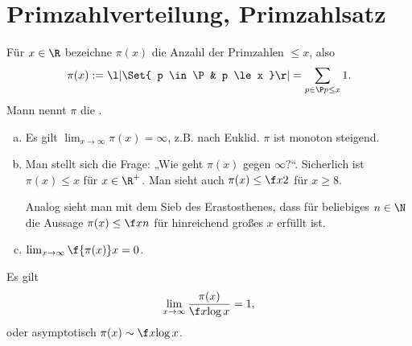 \chapter{Primzahlverteilung, Primzahlsatz} \label{chap:7}


\begin{df} \label{7.1}
	Für $x \in \R$ bezeichne $\pi(x)$ die Anzahl der Primzahlen $\le x$, also
	\[
		\pi(x)
		:= \l| \Set{ p \in \P & p \le x } \r|
		= \sum_{\substack{p \in \P}{p \le x}} 1.
	\]
	Mann nennt $\pi$ die .
\end{df}

\begin{nt*}
	\begin{enumerate}[a)]
		\item
			Es gilt $\lim_{x \to \infty} \pi(x) = \infty$, z.B. nach Euklid.
			$\pi$ ist monoton steigend.
		\item
			Man stellt sich die Frage: „Wie geht $\pi(x)$ gegen $\infty$?“.
			Sicherlich ist $\pi(x) \le x$ für $x \in \R^+$.
			Man sieht auch $\pi(x) \le \f x2$ für $x \ge 8$.

			Analog sieht man mit dem Sieb des Erastosthenes, dass für beliebiges $n \in \N$ die Aussage $\pi(x) \le \f xn$ für hinreichend großes $x$ erfüllt ist.
		\item
			$\lim_{x\to\infty} \f {\pi(x)}x = 0$.
	\end{enumerate}
\end{nt*}

\setcounter{thm}{2}
\begin{st} \label{7.3}
	Es gilt
	\[
		\lim_{x\to\infty} \dfrac {\pi(x)}{\f x{\log x}} = 1,
	\]
	oder asymptotisch $\pi(x) \sim \f x{\log x}$.
\end{st}

